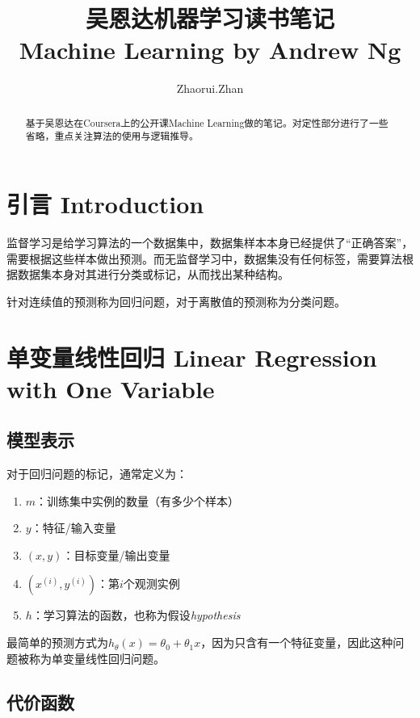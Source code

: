 \documentclass[12pt, a4paper]{article}
\title{吴恩达机器学习读书笔记 \\ Machine Learning by Andrew Ng}
\author{Zhaorui.Zhan}
\date{}
\begin{document}
\maketitle

\begin{abstract}    
    基于吴恩达在Coursera上的公开课Machine Learning做的笔记。对定性部分进行了一些省略，重点关注算法的使用与逻辑推导。
\end{abstract}

\tableofcontents
\newpage

\section{引言 Introduction}

监督学习是给学习算法的一个数据集中，数据集样本本身已经提供了“正确答案”，需要根据这些样本做出预测。而无监督学习中，数据集没有任何标签，需要算法根据数据集本身对其进行分类或标记，从而找出某种结构。

针对连续值的预测称为回归问题，对于离散值的预测称为分类问题。

\section{单变量线性回归 Linear Regression with One Variable}

\subsection{模型表示}

对于回归问题的标记，通常定义为：

\begin{enumerate}
    \item 
          $m$：训练集中实例的数量（有多少个样本）
    \item 
          $y$：特征/输入变量
    \item 
          $(x, y)$：目标变量/输出变量
    \item 
          $(x^{(i)}, y^{(i)})$：第$i$个观测实例
    \item 
          $h$：学习算法的函数，也称为假设\textit{hypothesis}
\end{enumerate}

最简单的预测方式为$h_\theta(x)=\theta_0 + \theta_1x$，因为只含有一个特征变量，因此这种问题被称为单变量线性回归问题。

\subsection{代价函数}
\end{document}
